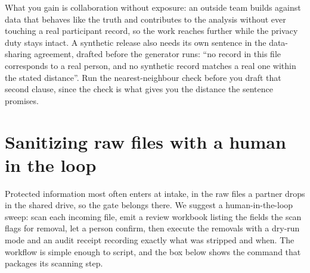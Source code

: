 What you gain is collaboration without exposure: an outside team builds against data that behaves like the truth and contributes to the analysis without ever touching a real participant record, so the work reaches further while the privacy duty stays intact.  A synthetic release also needs its own sentence in the data-sharing agreement, drafted before the generator runs: \enquote{no record in this file corresponds to a real person, and no synthetic record matches a real one within the stated distance}. Run the nearest-neighbour check before you draft that second clause, since the check is what gives you the distance the sentence promises.

\section{Sanitizing raw files with a human in the loop}\label{sec:rawsweep}
Protected information most often enters at intake, in the raw files a partner drops in the shared drive, so the gate belongs there. We suggest a human-in-the-loop sweep: scan each incoming file, emit a review workbook listing the fields the scan flags for removal, let a person confirm, then execute the removals with a dry-run mode and an audit receipt recording exactly what was stripped and when. The workflow is simple enough to script, and the box below shows the command that packages its scanning step.

